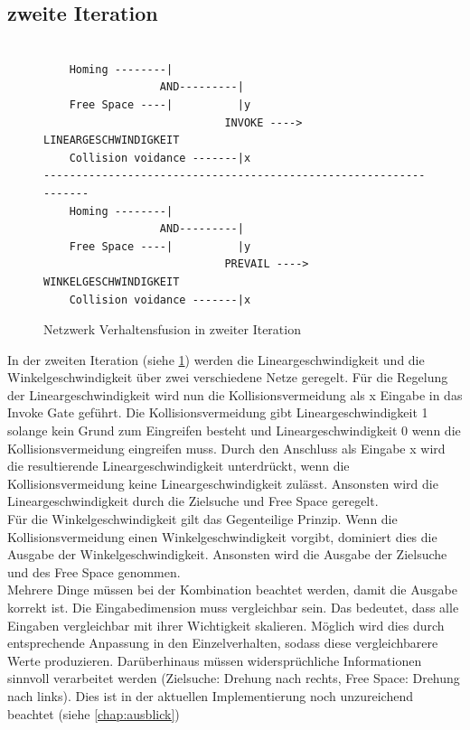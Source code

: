 \documentclass[12pt, a4paper]{report}
\begin{document}
\subsection{zweite Iteration}
\begin{figure}
    \begin{lstlisting}

    Homing --------|
                  AND---------|  
    Free Space ----|          |y
                            INVOKE ----> LINEARGESCHWINDIGKEIT   
    Collision voidance -------|x
------------------------------------------------------------------
    Homing --------|
                  AND---------|  
    Free Space ----|          |y
                            PREVAIL ----> WINKELGESCHWINDIGKEIT   
    Collision voidance -------|x
    \end{lstlisting}
    \caption{Netzwerk Verhaltensfusion in zweiter Iteration}
    \label{listing:zweitesNetzwerk}
\end{figure}
In der zweiten Iteration (siehe \ref{listing:zweitesNetzwerk}) werden die Lineargeschwindigkeit und die Winkelgeschwindigkeit über zwei verschiedene Netze geregelt. Für die Regelung der Lineargeschwindigkeit wird nun die Kollisionsvermeidung als x Eingabe in das Invoke Gate geführt. Die Kollisionsvermeidung gibt Lineargeschwindigkeit 1 solange kein Grund zum Eingreifen besteht und Lineargeschwindigkeit 0 wenn die Kollisionsvermeidung eingreifen muss. Durch den Anschluss als Eingabe x wird die resultierende Lineargeschwindigkeit unterdrückt, wenn die Kollisionsvermeidung keine Lineargeschwindigkeit zulässt. Ansonsten wird die Lineargeschwindigkeit durch die Zielsuche und Free Space geregelt.
\\
Für die Winkelgeschwindigkeit gilt das Gegenteilige Prinzip. Wenn die Kollisionsvermeidung einen Winkelgeschwindigkeit vorgibt, dominiert dies die Ausgabe der Winkelgeschwindigkeit. Ansonsten wird die Ausgabe der Zielsuche und des Free Space genommen.
\\
Mehrere Dinge müssen bei der Kombination beachtet werden, damit die Ausgabe korrekt ist. Die Eingabedimension muss vergleichbar sein. Das bedeutet, dass alle Eingaben vergleichbar mit ihrer Wichtigkeit skalieren. Möglich wird dies durch entsprechende Anpassung in den Einzelverhalten, sodass diese vergleichbarere Werte produzieren. Darüberhinaus müssen widersprüchliche Informationen sinnvoll verarbeitet werden (Zielsuche: Drehung nach rechts, Free Space: Drehung nach links). Dies ist in der aktuellen Implementierung noch unzureichend beachtet (siehe \ref{chap:ausblick})
\end{document}
